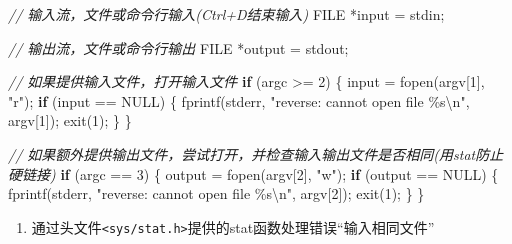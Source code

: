 \documentclass[
]{article}
\newenvironment{Shaded}{}{}
\newcommand{\CommentTok}[1]{\textcolor[rgb]{0.38,0.63,0.69}{\textit{#1}}}
\newcommand{\ControlFlowTok}[1]{\textcolor[rgb]{0.00,0.44,0.13}{\textbf{#1}}}
\newcommand{\DataTypeTok}[1]{\textcolor[rgb]{0.56,0.13,0.00}{#1}}
\newcommand{\DecValTok}[1]{\textcolor[rgb]{0.25,0.63,0.44}{#1}}
\newcommand{\NormalTok}[1]{#1}
\newcommand{\OperatorTok}[1]{\textcolor[rgb]{0.40,0.40,0.40}{#1}}
\newcommand{\SpecialCharTok}[1]{\textcolor[rgb]{0.25,0.44,0.63}{#1}}
\newcommand{\StringTok}[1]{\textcolor[rgb]{0.25,0.44,0.63}{#1}}
\begin{document}
\begin{Shaded}
	\begin{Highlighting}[]
		\CommentTok{// 输入流，文件或命令行输入(Ctrl+D结束输入)}
		\DataTypeTok{FILE} \OperatorTok{*}\NormalTok{input }\OperatorTok{=}\NormalTok{ stdin}\OperatorTok{;}

		\CommentTok{// 输出流，文件或命令行输出}
		\DataTypeTok{FILE} \OperatorTok{*}\NormalTok{output }\OperatorTok{=}\NormalTok{ stdout}\OperatorTok{;}

		\CommentTok{// 如果提供输入文件，打开输入文件}
		\ControlFlowTok{if} \OperatorTok{(}\NormalTok{argc }\OperatorTok{\textgreater{}=} \DecValTok{2}\OperatorTok{)} \OperatorTok{\{}
		\NormalTok{    input }\OperatorTok{=}\NormalTok{ fopen}\OperatorTok{(}\NormalTok{argv}\OperatorTok{[}\DecValTok{1}\OperatorTok{],} \StringTok{"r"}\OperatorTok{);}
		\ControlFlowTok{if} \OperatorTok{(}\NormalTok{input }\OperatorTok{==}\NormalTok{ NULL}\OperatorTok{)} \OperatorTok{\{}
		\NormalTok{        fprintf}\OperatorTok{(}\NormalTok{stderr}\OperatorTok{,} \StringTok{"reverse: cannot open file \textquotesingle{}}\SpecialCharTok{\%s}\StringTok{\textquotesingle{}}\SpecialCharTok{\textbackslash{}n}\StringTok{"}\OperatorTok{,}\NormalTok{ argv}\OperatorTok{[}\DecValTok{1}\OperatorTok{]);}
		\NormalTok{        exit}\OperatorTok{(}\DecValTok{1}\OperatorTok{);}
		\OperatorTok{\}}
		\OperatorTok{\}}

		\CommentTok{// 如果额外提供输出文件，尝试打开，并检查输入输出文件是否相同(用stat防止硬链接)}
		\ControlFlowTok{if} \OperatorTok{(}\NormalTok{argc }\OperatorTok{==} \DecValTok{3}\OperatorTok{)} \OperatorTok{\{}
		\NormalTok{    output }\OperatorTok{=}\NormalTok{ fopen}\OperatorTok{(}\NormalTok{argv}\OperatorTok{[}\DecValTok{2}\OperatorTok{],} \StringTok{"w"}\OperatorTok{);}
		\ControlFlowTok{if} \OperatorTok{(}\NormalTok{output }\OperatorTok{==}\NormalTok{ NULL}\OperatorTok{)} \OperatorTok{\{}
		\NormalTok{        fprintf}\OperatorTok{(}\NormalTok{stderr}\OperatorTok{,} \StringTok{"reverse: cannot open file \textquotesingle{}}\SpecialCharTok{\%s}\StringTok{\textquotesingle{}}\SpecialCharTok{\textbackslash{}n}\StringTok{"}\OperatorTok{,}\NormalTok{ argv}\OperatorTok{[}\DecValTok{2}\OperatorTok{]);}
		\NormalTok{        exit}\OperatorTok{(}\DecValTok{1}\OperatorTok{);}
		\OperatorTok{\}}
		\OperatorTok{\}}
	\end{Highlighting}
\end{Shaded}

\begin{enumerate}[resume]
	\def\labelenumi{\arabic{enumi}.}
	\item
	      通过头文件\texttt{\textless{}sys/stat.h\textgreater{}}提供的stat函数处理错误``输入相同文件''
\end{enumerate}
\end{document}
